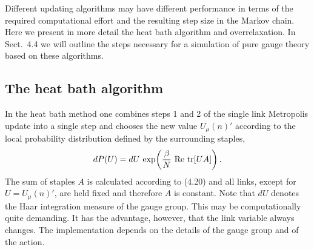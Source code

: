 Different updating algorithms may have different performance in terms of the
required computational effort and the resulting step size in the Markov chain.
Here we present in more detail the heat bath algorithm and overrelaxation.
In Sect.~4.4 we will outline the steps necessary for a simulation of pure gauge
theory based on these algorithms.

\subsection{The heat bath algorithm}

In the heat bath method one combines steps 1 and 2 of the single link Metropolis update into a single step and chooses the new value $U_\mu(n)'$ according to
the local probability distribution defined by the surrounding staples,
\begin{equation}
  dP(U) = dU\,\exp\!\left(\frac{\beta}{N}\,\operatorname{Re}\,\operatorname{tr}[U A]\right).
\end{equation}
The sum of staples $A$ is calculated according to (4.20) and all links, except
for $U = U_\mu(n)'$, are held fixed and therefore $A$ is constant. Note that $dU$
denotes the Haar integration measure of the gauge group. This may be computationally quite demanding. It has the advantage, however, that the link
variable always changes. The implementation depends on the details of the
gauge group and of the action.

